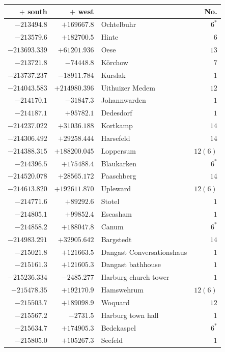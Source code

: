 \clearpage{}%
\begin{center}\begingroup\fontsize{8}{9}\selectfont
\setlength{\tabcolsep}{4pt}
\begin{tabular}{r|r|p{170pt}|r}\hline
\(+\) south&\(+\) west&&No.\\\hline
\(-213494.8\)&\(+169667.8\)&Ochtelbuhr&\(6^{*}\)\\
\(-213579.6\)&\(+182700.5\)&Hinte&\(6\)\\
\(-213693.339\)&\(+61201.936\)&Oese&\(13\)\\
\(-213721.8\)&\(-74448.8\)&Körchow&\(7\)\\
\(-213737.237\)&\(-18911.784\)&Kurslak&\(1\)\\
\(-214043.583\)&\(+214980.396\)&Uithuizer Medem&\(12\)\\
\(-214170.1\)&\(-31847.3\)&Johannwarden&\(1\)\\
\(-214187.1\)&\(+95782.1\)&Dedesdorf&\(1\)\\
\(-214237.022\)&\(+31036.188\)&Kortkamp&\(14\)\\
\(-214306.492\)&\(+29258.444\)&Harsefeld&\(14\)\\
\(-214388.315\)&\(+188200.045\)&Loppersum&\(12 (6)\)\\
\(-214396.5\)&\(+175488.4\)&Blaukarken&\(6^{*}\)\\
\(-214520.078\)&\(+28565.172\)&Paaschberg&\(14\)\\
\(-214613.820\)&\(+192611.870\)&Upleward&\(12 (6)\)\\
\(-214771.6\)&\(+89292.6\)&Stotel&\(1\)\\
\(-214805.1\)&\(+99852.4\)&Eseasham&\(1\)\\
\(-214858.2\)&\(+188047.8\)&Canum&\(6^{*}\)\\
\(-214983.291\)&\(+32905.642\)&Bargstedt&\(14\)\\
\(-215021.8\)&\(+121663.5\)&Dangast Conversationshaus&\(1\)\\
\(-215161.3\)&\(+121605.3\)&Dangast bathhouse&\(1\)\\
\(-215236.334\)&\(-2485.277\)&Harburg church tower&\(1\)\\
\(-215478.35\)&\(+192170.9\)&Hamswehrum&\(12 (6)\)\\
\(-215503.7\)&\(+189098.9\)&Woquard&\(12\)\\
\(-215567.2\)&\(-2731.5\)&Harburg town hall&\(1\)\\
\(-215634.7\)&\(+174905.3\)&Bedekaspel&\(6^{*}\)\\
\(-215805.0\)&\(+105267.3\)&Seefeld&\(1\)\\

\end{tabular}
\end{center}
